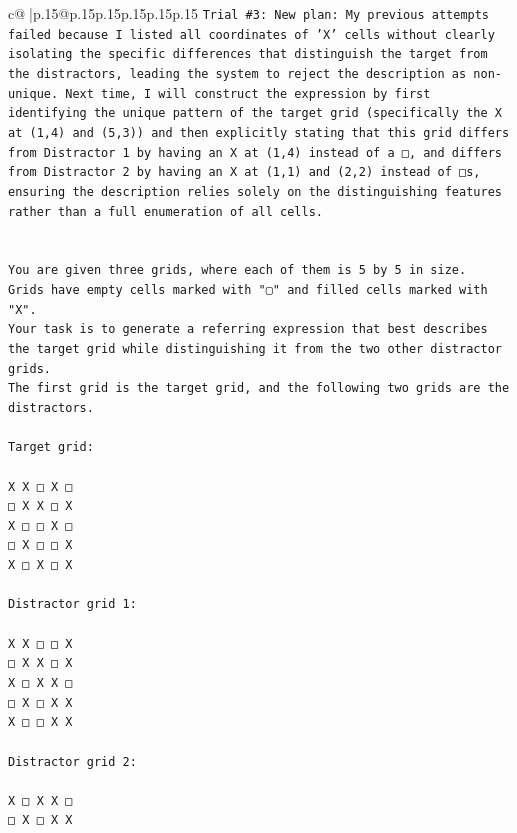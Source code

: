 \documentclass{article}
\begin{document}
{\begin{supertabular}{c@{$\;$}|p{.15\linewidth}@{}p{.15\linewidth}p{.15\linewidth}p{.15\linewidth}p{.15\linewidth}p{.15\linewidth}}
{{{\texttt{Trial \#3: New plan: My previous attempts failed because I listed all coordinates of 'X' cells without clearly isolating the specific differences that distinguish the target from the distractors, leading the system to reject the description as non{-}unique. Next time, I will construct the expression by first identifying the unique pattern of the target grid (specifically the X at (1,4) and (5,3)) and then explicitly stating that this grid differs from Distractor 1 by having an X at (1,4) instead of a □, and differs from Distractor 2 by having an X at (1,1) and (2,2) instead of □s, ensuring the description relies solely on the distinguishing features rather than a full enumeration of all cells.} \\
\\ 
\\ 
\texttt{You are given three grids, where each of them is 5 by 5 in size.} \\
\texttt{Grids have empty cells marked with "▢" and filled cells marked with "X".} \\
\texttt{Your task is to generate a referring expression that best describes the target grid while distinguishing it from the two other distractor grids.} \\
\texttt{The first grid is the target grid, and the following two grids are the distractors.} \\
\\ 
\texttt{Target grid:} \\
\\ 
\texttt{X X □ X □} \\
\texttt{□ X X □ X} \\
\texttt{X □ □ X □} \\
\texttt{□ X □ □ X} \\
\texttt{X □ X □ X} \\
\\ 
\texttt{Distractor grid 1:} \\
\\ 
\texttt{X X □ □ X} \\
\texttt{□ X X □ X} \\
\texttt{X □ X X □} \\
\texttt{□ X □ X X} \\
\texttt{X □ □ X X} \\
\\ 
\texttt{Distractor grid 2:} \\
\\ 
\texttt{X □ X X □} \\
\texttt{□ X □ X X} \\
}}}
\end{supertabular}}
\end{document}
